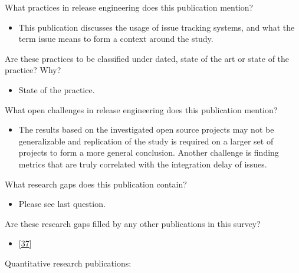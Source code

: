 \documentclass[]{book}
\providecommand{\tightlist}{%
  \setlength{\itemsep}{0pt}\setlength{\parskip}{0pt}}
\begin{document}
What practices in release engineering does this publication mention?

\begin{itemize}
\tightlist
\item
  This publication discusses the usage of issue tracking systems, and
  what the term issue means to form a context around the study.
\end{itemize}

Are these practices to be classified under dated, state of the art or
state of the practice? Why?

\begin{itemize}
\tightlist
\item
  State of the practice.
\end{itemize}

What open challenges in release engineering does this publication
mention?

\begin{itemize}
\tightlist
\item
  The results based on the investigated open source projects may not be
  generalizable and replication of the study is required on a larger set
  of projects to form a more general conclusion. Another challenge is
  finding metrics that are truly correlated with the integration delay
  of issues.
\end{itemize}

What research gaps does this publication contain?

\begin{itemize}
\tightlist
\item
  Please see last question.
\end{itemize}

Are these research gaps filled by any other publications in this survey?

\begin{itemize}
\tightlist
\item
  {[}\protect\hyperlink{ref-da2016a}{37}{]}
\end{itemize}

Quantitative research publications:
\end{document}
